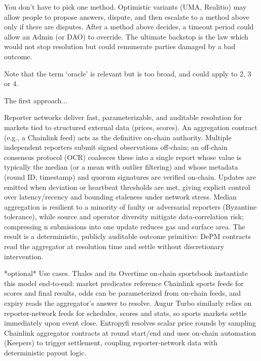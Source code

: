 You don't have to pick one method. Optimistic variants (UMA, Realitio) may allow people to propose answers, dispute, and then escalate to a method above only if there are disputes. After a method above decides, a timeout period could allow an Admin (or DAO) to override. The ultimate backstop is the law which would not stop resolution but could remunerate parties damaged by a bad outcome. %

Note that the term `oracle' is relevant but is too broad, and could apply to 2, 3 or 4. %


The first approach...





Reporter networks deliver fast, parameterizable, and auditable resolution for markets tied to structured external data (prices, scores). An aggregation contract (e.g., a Chainlink feed) acts as the definitive on-chain authority. Multiple independent reporters submit signed observations off-chain; an off‑chain consensus protocol (OCR) coalesces these into a single report whose value is typically the median (or a mean with outlier filtering) and whose metadata (round ID, timestamp) and quorum signatures are verified on-chain. Updates are emitted when deviation or heartbeat thresholds are met, giving explicit control over latency/recency and bounding staleness under network stress. Median aggregation is resilient to a minority of faulty or adversarial reporters (Byzantine tolerance), while source and operator diversity mitigate data‑correlation risk; compressing n submissions into one update reduces gas and surface area. The result is a deterministic, publicly auditable outcome primitive: DePM contracts read the aggregator at resolution time and settle without discretionary intervention.

*optional* Use cases. Thales and its Overtime on‑chain sportsbook instantiate this model end‑to‑end: market predicates reference Chainlink sports feeds for scores and final results, odds can be parameterized from on‑chain feeds, and expiry reads the aggregator’s answer to resolve. Augur Turbo similarly relies on reporter‑network feeds for schedules, scores and stats, so sports markets settle immediately upon event close. Entropyfi resolves scalar price rounds by sampling Chainlink aggregator contracts at round start/end and uses on‑chain automation (Keepers) to trigger settlement, coupling reporter‑network data with deterministic payout logic. 

